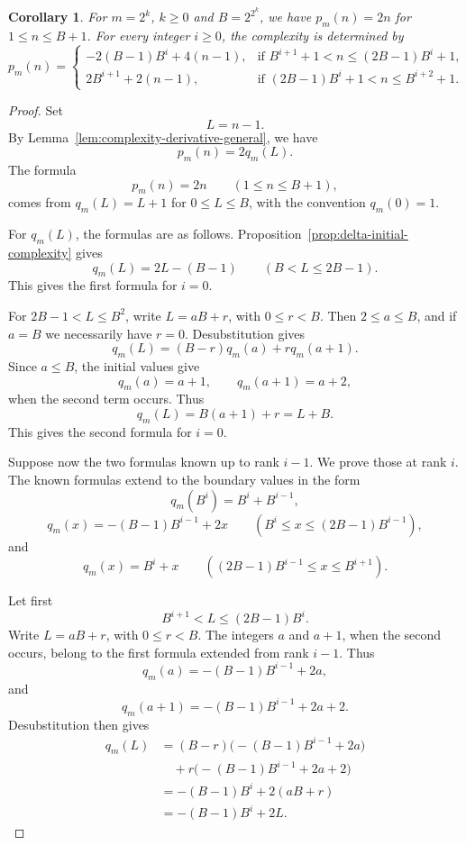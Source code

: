 \documentclass[12pt,reqno]{article}
\theoremstyle{plain}
\newtheorem{corollary}[theorem]{Corollary}
\theoremstyle{definition}
\begin{document}
\begin{corollary}
\label{cor:primary-closed-complexity}
For $m=2^k$, $k\ge 0$ and $B=2^{2^k}$, we have $p_m(n)=2n$ for $1\le n\le B+1$. For every integer $i\ge 0$, the complexity is determined by
\[
  p_m(n)=
  \begin{cases}
    -2(B-1)B^i+4(n-1),
       & \text{if } B^{i+1}+1<n\le (2B-1)B^i+1,\\[2mm]
    2B^{i+1}+2(n-1),
       & \text{if } (2B-1)B^i+1<n\le B^{i+2}+1.
  \end{cases}
\]
\end{corollary}

\begin{proof}
Set
\[
  L = n - 1.
\]
By Lemma~\ref{lem:complexity-derivative-general}, we have
\[
  p_m(n) = 2 q_m(L).
\]
The formula
\[
  p_m(n) = 2n \qquad (1 \le n \le B + 1),
\]
comes from $q_m(L) = L + 1$ for $0 \le L \le B$, with the convention $q_m(0) = 1$.

For $q_m(L)$, the formulas are as follows. Proposition~\ref{prop:delta-initial-complexity} gives
\[
  q_m(L) = 2L - (B - 1) \qquad (B < L \le 2B - 1).
\]
This gives the first formula for $i = 0$.

For $2B - 1 < L \le B^2$, write $L = aB + r$, with $0 \le r < B$. Then $2 \le a \le B$, and if $a = B$ we necessarily have $r = 0$. Desubstitution gives
\[
  q_m(L) = (B - r) q_m(a) + r q_m(a + 1).
\]
Since $a \le B$, the initial values give
\[
  q_m(a) = a + 1, \qquad q_m(a + 1) = a + 2,
\]
when the second term occurs. Thus
\[
  q_m(L) = B(a + 1) + r = L + B.
\]
This gives the second formula for $i = 0$.

Suppose now the two formulas known up to rank $i - 1$. We prove those at rank $i$. The known formulas extend to the boundary values in the form
\[
  q_m(B^i) = B^i + B^{i-1},
\]
\[
  q_m(x) = -(B - 1) B^{i-1} + 2x \qquad (B^i \le x \le (2B - 1) B^{i-1}),
\]
and
\[
  q_m(x) = B^i + x \qquad ((2B - 1) B^{i-1} \le x \le B^{i+1}).
\]

Let first
\[
  B^{i+1} < L \le (2B - 1) B^i.
\]
Write $L = aB + r$, with $0 \le r < B$. The integers $a$ and $a + 1$, when the second occurs, belong to the first formula extended from rank $i - 1$. Thus
\[
  q_m(a) = -(B - 1) B^{i-1} + 2a,
\]
and
\[
  q_m(a + 1) = -(B - 1) B^{i-1} + 2a + 2.
\]
Desubstitution then gives
\[
\begin{aligned}
  q_m(L) &= (B - r) \bigl(-(B - 1) B^{i-1} + 2a\bigr) \\
         &\quad + r \bigl(-(B - 1) B^{i-1} + 2a + 2\bigr) \\
         &= -(B - 1) B^i + 2(aB + r) \\
         &= -(B - 1) B^i + 2L.
\end{aligned}
\]


\end{proof}
\end{document}

